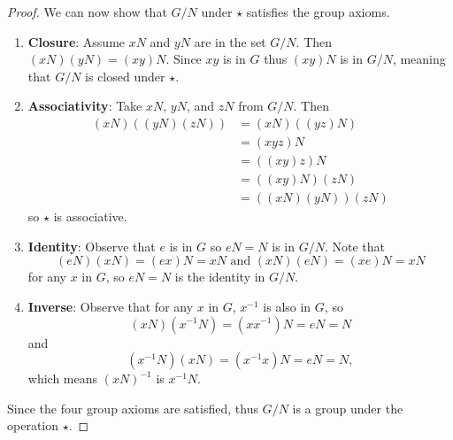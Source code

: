 \begin{proof}
    We can now show that $G/N$ under $\star$ satisfies the group axioms.
    \begin{enumerate}
        \item \textbf{Closure}: Assume $xN$ and $yN$ are in the set $G/N$. Then $(xN)(yN) = (xy)N$. Since $xy$ is in $G$ thus $(xy)N$ is in $G/N$, meaning that $G/N$ is closed under $\star$.
        \item \textbf{Associativity}: Take $xN$, $yN$, and $zN$ from $G/N$. Then
        \begin{align*}
            (xN)\left((yN)(zN)\right) &= (xN)\left((yz)N\right)\\
            &= (xyz)N\\
            &= \left((xy)z\right)N\\
            &= \left((xy)N\right)(zN)\\
            &= \left((xN)(yN)\right)(zN)
        \end{align*}
        so $\star$ is associative.
        \item \textbf{Identity}: Observe that $e$ is in $G$ so $eN = N$ is in $G / N$. Note that
        \[
        (eN)(xN) = (ex)N = xN \text{ and } (xN)(eN) = (xe)N = xN
        \]
        for any $x$ in $G$, so $eN = N$ is the identity in $G/N$.
        \item \textbf{Inverse}: Observe that for any $x$ in $G$, $x^{-1}$ is also in $G$, so
        \[
        (xN)(x^{-1}N) = (xx^{-1})N = eN = N
        \]
        and
        \[
        (x^{-1}N)(xN) = (x^{-1}x)N = eN = N,
        \]
        which means $(xN)^{-1}$ is $x^{-1}N$.
    \end{enumerate}
    Since the four group axioms are satisfied, thus $G/N$ is a group under the operation $\star$.
\end{proof}

